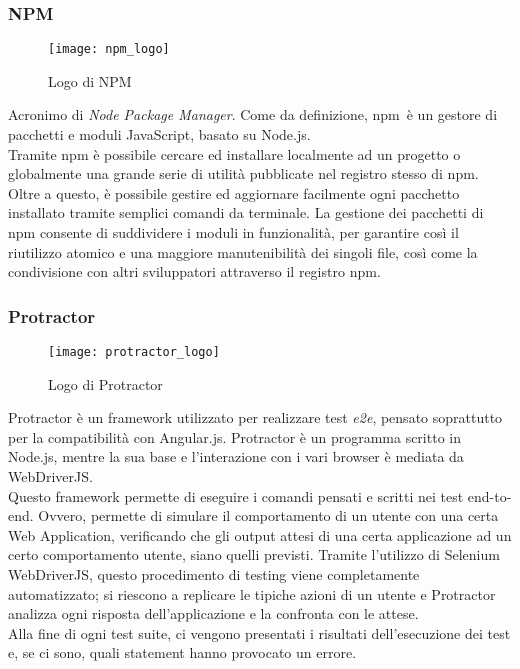 \subsubsection{NPM}
\begin{figure}[htb] 
    \centering 
    \texttt{[image: npm\_logo]} 
    \caption{Logo di NPM}
\end{figure}
Acronimo di \emph{Node Package Manager}. Come da definizione, \gls{npm}\glsfirstoccur\  è un gestore di pacchetti e moduli JavaScript, basato su Node.js.\\ 
Tramite npm è possibile cercare ed installare localmente ad un progetto o globalmente una grande serie di utilità pubblicate nel registro stesso di \gls{npm}. Oltre a questo, è possibile gestire ed aggiornare facilmente ogni pacchetto installato tramite semplici comandi da terminale.
La gestione dei pacchetti di npm consente di suddividere i moduli in funzionalità, per garantire così il riutilizzo atomico e una maggiore manutenibilità dei singoli file, così come la condivisione con altri sviluppatori attraverso il registro \gls{npm}. 

\subsubsection{Protractor}
\begin{figure}[htb] 
    \centering 
    \texttt{[image: protractor\_logo]} 
    \caption{Logo di Protractor}
\end{figure}
Protractor è un framework utilizzato per realizzare test \emph{e2e}, pensato soprattutto per la compatibilità con Angular.js. Protractor è un programma scritto in Node.js, mentre la sua base e l’interazione con i vari browser è mediata da WebDriverJS.\\
Questo framework permette di eseguire i comandi pensati e scritti nei test end-to-end. Ovvero, permette di simulare il comportamento di un utente con una certa Web Application, verificando che gli output attesi di una certa applicazione ad un certo comportamento utente, siano quelli previsti. Tramite l’utilizzo di Selenium WebDriverJS, questo procedimento di testing viene completamente automatizzato; si riescono a replicare le tipiche azioni di un utente e Protractor analizza ogni risposta dell’applicazione e la confronta con le attese.\\
Alla fine di ogni test suite, ci vengono presentati i risultati dell’esecuzione dei test e, se ci sono, quali statement hanno provocato un errore.

